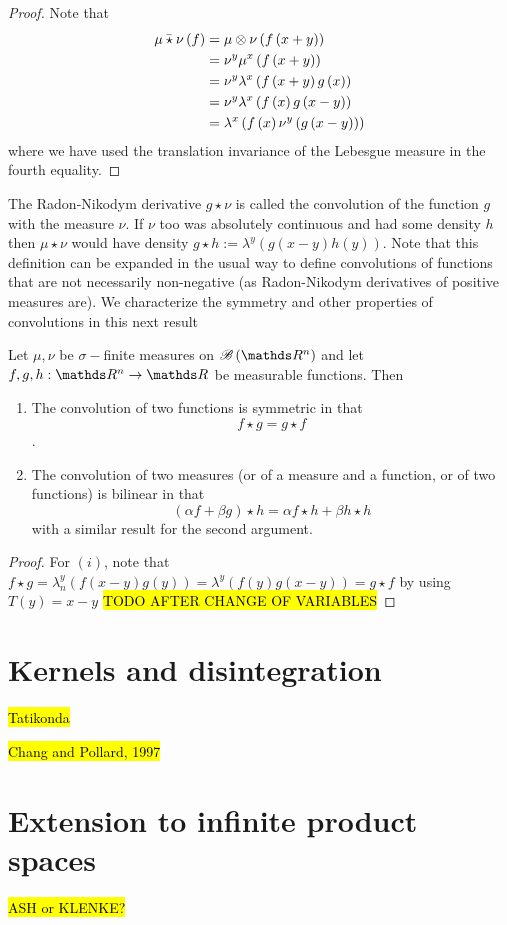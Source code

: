 \begin{proof}
Note that 
\begin{align*}
\bar{\mu\star\nu}\left(f\right) & =\mu\otimes\nu\left(f\left(x+y\right)\right)\\
 & =\nu^{y}\mu^{x}\left(f\left(x+y\right)\right)\\
 & =\nu^{y}\lambda^{x}\left(f\left(x+y\right)g\left(x\right)\right)\\
 & =\nu^{y}\lambda^{x}\left(f\left(x\right)g\left(x-y\right)\right)\\
 & =\lambda^{x}\left(f\left(x\right)\nu^{y}\left(g\left(x-y\right)\right)\right)
\end{align*}
where we have used the translation invariance of the Lebesgue measure
in the fourth equality.
\end{proof}
The Radon-Nikodym derivative $g\star\nu$ is called the convolution
of the function $g$ with the measure $\nu$. If $\nu$ too was absolutely
continuous and had some density $h$ then $\mu\star\nu$ would have
density $g\star h:=\lambda^{y}\left(g\left(x-y\right)h\left(y\right)\right)$.
Note that this definition can be expanded in the usual way to define
convolutions of functions that are not necessarily non-negative (as
Radon-Nikodym derivatives of positive measures are). We characterize
the symmetry and other properties of convolutions in this next result
\begin{prop}
\label{prop:propertiesConvolution}Let $\mu,\nu$ be $\sigma-$finite
measures on $\borel\left(\R^{n}\right)$ and let $f,g,h:\R^{n}\to\R$
be measurable functions. Then

\begin{enumerate}[label=(\roman*),leftmargin=.1\linewidth,rightmargin=.4\linewidth]
\item The convolution of two functions is symmetric in that $$ f \star g = g \star f $$. 
\item The convolution of two measures (or of a measure and a function, or of two functions) is bilinear in that 
$$ (\alpha f + \beta g) \star h = \alpha f \star h + \beta h \star h $$ with a similar result for the second argument.
\end{enumerate}
\end{prop}

\begin{proof}
For $\left(i\right)$, note that $f\star g=\lambda_{n}^{y}\left(f\left(x-y\right)g\left(y\right)\right)=\lambda^{y}\left(f\left(y\right)g\left(x-y\right)\right)=g\star f$
by using $T\left(y\right)=x-y$ \hl{TODO AFTER CHANGE OF VARIABLES}
\end{proof}
\begin{prop}
\label{prop:derivativeConvolution}
\end{prop}


\section{Kernels and disintegration}

\hl{Tatikonda}

\hl{Chang and Pollard, 1997}

\section{Extension to infinite product spaces}

\hl{ASH or KLENKE?}
